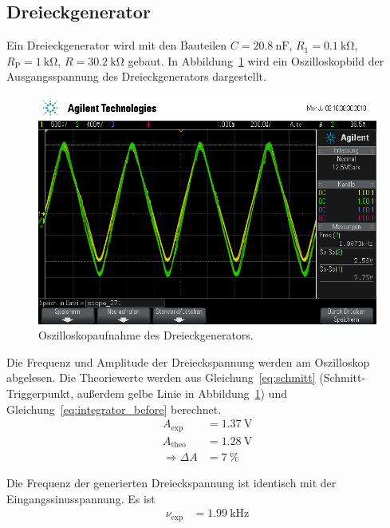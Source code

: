 \subsection{Dreieckgenerator}
Ein Dreieckgenerator wird mit den Bauteilen
$C = \SI{20.8}{\nano\farad}$,
$R_1 = \SI{0.1}{\kilo\ohm}$,
$R_\text{P} = \SI{1}{\kilo\ohm}$,
$R = \SI{30.2}{\kilo\ohm}$
gebaut.
In Abbildung~\ref{fig:dreieck_generator} wird ein Oszilloskopbild
der Ausgangsspannung des Dreieckgenerators dargestellt.
\begin{figure}[ht]
  \centering
  \includegraphics[height=0.3\textheight]{data/scope_271.png}
  \caption{Oszilloskopaufnahme des Dreieckgenerators.}
  \label{fig:dreieck_generator}
\end{figure}

Die Frequenz und Amplitude der Dreieckspannung werden am Oszilloskop abgelesen.
Die Theoriewerte werden aus Gleichung~\eqref{eq:schmitt} (Schmitt-Triggerpunkt, außerdem gelbe Linie in Abbildung~\ref{fig:dreieck_generator})
und Gleichung~\eqref{eq:integrator_before} berechnet.
\begin{align*}
  A_\text{exp} &= \SI{1.37}{\volt} \\
  A_\text{theo} &= \SI{1.28}{\volt} \\
  \Rightarrow \Delta A &= \SI{7}{\percent}
\end{align*}

Die Frequenz der generierten Dreieckspannung ist identisch mit der Eingangssinusspannung.
Es ist
\begin{align*}
  \nu_\text{exp} &= \SI{1.99}{\kilo\hertz} \\
\end{align*}

